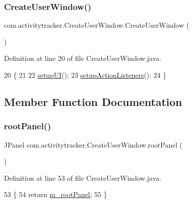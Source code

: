 \subsubsection{\texorpdfstring{Create\+User\+Window()}{CreateUserWindow()}}
{\footnotesize\ttfamily com.\+activitytracker.\+Create\+User\+Window.\+Create\+User\+Window (\begin{DoxyParamCaption}{ }\end{DoxyParamCaption})\hspace{0.3cm}{\ttfamily [package]}}



Definition at line 20 of file Create\+User\+Window.\+java.


\begin{DoxyCode}
20                        \{
21 
22         \mbox{\hyperlink{classcom_1_1activitytracker_1_1_create_user_window_a41715d85194c6bb84cf6969f771940dc}{setupUI}}();
23         \mbox{\hyperlink{classcom_1_1activitytracker_1_1_create_user_window_a174a05a389ca6f3b7979ac9c5028a3ae}{setupActionListeners}}();
24     \}
\end{DoxyCode}


\subsection{Member Function Documentation}
\mbox{\label{classcom_1_1activitytracker_1_1_create_user_window_a862f018ae96eb5df7529ff1beb312ff1}} 
\subsubsection{\texorpdfstring{root\+Panel()}{rootPanel()}}
{\footnotesize\ttfamily J\+Panel com.\+activitytracker.\+Create\+User\+Window.\+root\+Panel (\begin{DoxyParamCaption}{ }\end{DoxyParamCaption})\hspace{0.3cm}{\ttfamily [package]}}



Definition at line 53 of file Create\+User\+Window.\+java.


\begin{DoxyCode}
53                        \{
54         \textcolor{keywordflow}{return} \mbox{\hyperlink{classcom_1_1activitytracker_1_1_create_user_window_a5a678326afe519b6a2c9e7a2d9eff87c}{m\_rootPanel}};
55     \}
\end{DoxyCode}
\mbox{\label{classcom_1_1activitytracker_1_1_create_user_window_a174a05a389ca6f3b7979ac9c5028a3ae}} 

